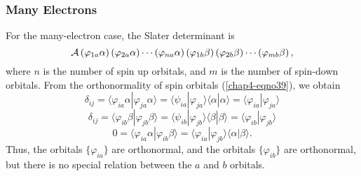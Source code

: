 {\subsubsection{Many Electrons}

For the many-electron case, the Slater determinant is
\begin{equation}
{\cal A} \left( \varphi_{1a} \alpha \right) \left( \varphi_{2a} \alpha \right) 
\cdots \left( \varphi_{na} \alpha \right) \left( \varphi_{1b} \beta \right) 
\left( \varphi_{2b} \beta \right) \cdots \left( \varphi_{mb} \beta 
\right),
\label{chap4-eqno45}
\end{equation}
where $n$ is the number of spin up orbitals, and $m$ is the number of
spin-down orbitals.  From the orthonormality of spin orbitals
(\ref{chap4-eqno39}), we obtain
\begin{equation}
\delta_{ij} = \langle \varphi_{ia} \alpha | \varphi_{ja} \alpha \rangle = 
\langle \psi_{ia} | \varphi_{ja} \rangle \langle \alpha | \alpha \rangle = 
\langle \varphi_{ia} | \varphi_{ja} \rangle
\end{equation}
\begin{equation}
\delta_{ij} = \langle \varphi_{ib} \beta | \varphi_{jb} \beta \rangle = 
\langle \psi_{ib} | \varphi_{jb} \rangle \langle \beta | \beta \rangle = 
\langle \varphi_{ib} | \varphi_{jb} \rangle
\end{equation}
\begin{equation}
0 = \langle \varphi_{ia} \alpha | \varphi_{ib} \beta \rangle = \langle 
\varphi_{ia} | \varphi_{jb} \rangle \langle \alpha | \beta \rangle.
\end{equation}
Thus, the orbitals $\{ \varphi_{ia} \}$ are orthonormal, and the orbitals $\{ 
\varphi_{ib} \}$ are orthonormal, but there is no special relation between 
the $a$ and $b$ orbitals.

}

